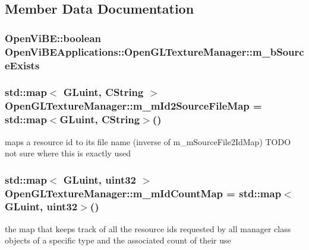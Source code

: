 \subsection{Member Data Documentation}
\hypertarget{classOpenViBEApplications_1_1OpenGLTextureManager_a7724d7b37ba2abfe1f83f47dfb428c31}{
\subsubsection[{m\_\-bSourceExists}]{\setlength{\rightskip}{0pt plus 5cm}OpenViBE::boolean {\bf OpenViBEApplications::OpenGLTextureManager::m\_\-bSourceExists}}}
\label{classOpenViBEApplications_1_1OpenGLTextureManager_a7724d7b37ba2abfe1f83f47dfb428c31}
\hypertarget{classOpenViBEApplications_1_1OpenGLTextureManager_af694696e563fa4e71386217ddb15b061}{
\subsubsection[{m\_\-mId2SourceFileMap}]{\setlength{\rightskip}{0pt plus 5cm}std::map$<$ GLuint, CString $>$ {\bf OpenGLTextureManager::m\_\-mId2SourceFileMap} = std::map$<$GLuint, CString$>$()}}
\label{classOpenViBEApplications_1_1OpenGLTextureManager_af694696e563fa4e71386217ddb15b061}
maps a resource id to its file name (inverse of m\_\-mSourceFile2IdMap) TODO not sure where this is exactly used \hypertarget{classOpenViBEApplications_1_1OpenGLTextureManager_abd308f1802ef4570dc6fce3f6b7ce35c}{
\subsubsection[{m\_\-mIdCountMap}]{\setlength{\rightskip}{0pt plus 5cm}std::map$<$ GLuint, uint32 $>$ {\bf OpenGLTextureManager::m\_\-mIdCountMap} = std::map$<$GLuint, uint32$>$()}}
\label{classOpenViBEApplications_1_1OpenGLTextureManager_abd308f1802ef4570dc6fce3f6b7ce35c}
the map that keeps track of all the resource ids requested by all manager class objects of a specific type and the associated count of their use 

